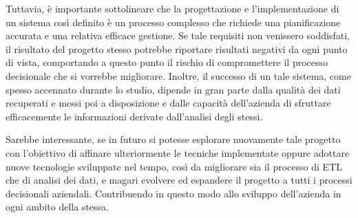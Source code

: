 Tuttavia, è importante sottolineare che la progettazione e l'implementazione di un sistema così definito è un processo complesso che richiede una pianificazione accurata e una relativa efficace gestione. Se tale requisiti non venissero soddisfati, il risultato del progetto stesso potrebbe riportare risultati negativi da ogni punto di vista, comportando a questo punto il rischio di compromettere il processo decisionale che si vorrebbe migliorare. Inoltre, il successo di un tale sistema, come spesso accennato durante lo studio, dipende in gran parte dalla qualità dei dati recuperati e messi poi a disposizione e dalle capacità dell'azienda di sfruttare efficacemente le informazioni derivate dall'analisi degli stessi.

Sarebbe interessante, se in futuro si potesse esplorare nuovamente tale progetto con l'obiettivo di affinare ulteriormente le tecniche implementate oppure adottare nuove tecnologie sviluppate nel tempo, così da migliorare sia il processo di ETL che di analisi dei dati, e magari evolvere ed espandere il progetto a tutti i processi decisionali aziendali. Contribuendo in questo modo allo sviluppo dell'azienda in ogni ambito della stessa.